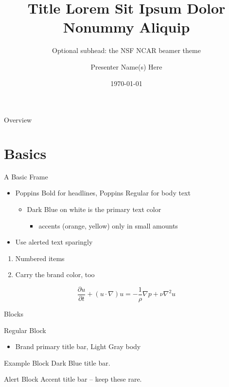 \documentclass[aspectratio=\engineaspectratio]{beamer}
\title{Title Lorem Sit Ipsum Dolor Nonummy Aliquip}
\subtitle{Optional subhead: the NSF NCAR beamer theme}
\author{Presenter Name(s) Here}
\institute{Presenter Title, CISL, NSF NCAR}
\date{\today}
\begin{document}
\begin{frame}
  \titlepage
\end{frame}

\begin{frame}{Overview}
  \tableofcontents
\end{frame}

\section{Basics}

\begin{frame}{A Basic Frame}
  \begin{itemize}
  \item Poppins Bold for headlines, Poppins Regular for body text
    \begin{itemize}
    \item Dark Blue on white is the primary text color
      \begin{itemize}
      \item accents (orange, yellow) only in small amounts
      \end{itemize}
    \end{itemize}
  \item Use \alert{alerted text} sparingly
  \end{itemize}
  \begin{enumerate}
  \item Numbered items
  \item Carry the brand color, too
  \end{enumerate}
  \begin{equation}
    \frac{\partial u}{\partial t} + (u\cdot\nabla)u = -\frac{1}{\rho}\nabla p + \nu\nabla^2 u
  \end{equation}
\end{frame}

\begin{frame}{Blocks}
  \begin{block}{Regular Block}
    \begin{itemize}
    \item Brand primary title bar, Light Gray body
    \end{itemize}
  \end{block}
  \begin{exampleblock}{Example Block}
    Dark Blue title bar.
  \end{exampleblock}
  \begin{alertblock}{Alert Block}
    Accent title bar -- keep these rare.
  \end{alertblock}
\end{frame}
\end{document}

